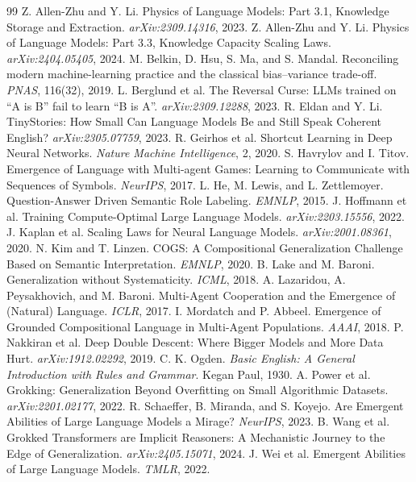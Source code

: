 \documentclass[11pt,a4paper]{article}
\begin{document}
\begin{thebibliography}{99}
\small
{} Z. Allen-Zhu and Y. Li. Physics of Language Models: Part 3.1, Knowledge Storage and Extraction. \textit{arXiv:2309.14316}, 2023.
 Z. Allen-Zhu and Y. Li. Physics of Language Models: Part 3.3, Knowledge Capacity Scaling Laws. \textit{arXiv:2404.05405}, 2024.
 M. Belkin, D. Hsu, S. Ma, and S. Mandal. Reconciling modern machine-learning practice and the classical bias--variance trade-off. \textit{PNAS}, 116(32), 2019.
 L. Berglund et al. The Reversal Curse: LLMs trained on ``A is B'' fail to learn ``B is A''. \textit{arXiv:2309.12288}, 2023.
 R. Eldan and Y. Li. TinyStories: How Small Can Language Models Be and Still Speak Coherent English? \textit{arXiv:2305.07759}, 2023.
 R. Geirhos et al. Shortcut Learning in Deep Neural Networks. \textit{Nature Machine Intelligence}, 2, 2020.
 S. Havrylov and I. Titov. Emergence of Language with Multi-agent Games: Learning to Communicate with Sequences of Symbols. \textit{NeurIPS}, 2017.
 L. He, M. Lewis, and L. Zettlemoyer. Question-Answer Driven Semantic Role Labeling. \textit{EMNLP}, 2015.
 J. Hoffmann et al. Training Compute-Optimal Large Language Models. \textit{arXiv:2203.15556}, 2022.
 J. Kaplan et al. Scaling Laws for Neural Language Models. \textit{arXiv:2001.08361}, 2020.
 N. Kim and T. Linzen. COGS: A Compositional Generalization Challenge Based on Semantic Interpretation. \textit{EMNLP}, 2020.
 B. Lake and M. Baroni. Generalization without Systematicity. \textit{ICML}, 2018.
 A. Lazaridou, A. Peysakhovich, and M. Baroni. Multi-Agent Cooperation and the Emergence of (Natural) Language. \textit{ICLR}, 2017.
 I. Mordatch and P. Abbeel. Emergence of Grounded Compositional Language in Multi-Agent Populations. \textit{AAAI}, 2018.
 P. Nakkiran et al. Deep Double Descent: Where Bigger Models and More Data Hurt. \textit{arXiv:1912.02292}, 2019.
 C. K. Ogden. \textit{Basic English: A General Introduction with Rules and Grammar}. Kegan Paul, 1930.
 A. Power et al. Grokking: Generalization Beyond Overfitting on Small Algorithmic Datasets. \textit{arXiv:2201.02177}, 2022.
 R. Schaeffer, B. Miranda, and S. Koyejo. Are Emergent Abilities of Large Language Models a Mirage? \textit{NeurIPS}, 2023.
 B. Wang et al. Grokked Transformers are Implicit Reasoners: A Mechanistic Journey to the Edge of Generalization. \textit{arXiv:2405.15071}, 2024.
 J. Wei et al. Emergent Abilities of Large Language Models. \textit{TMLR}, 2022.
\end{thebibliography}
\end{document}
